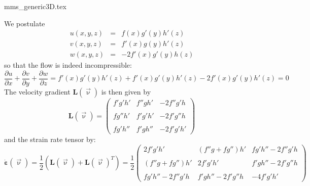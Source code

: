 \begin{flushright} {\tiny {\color{gray} mms\_generic3D.tex}} \end{flushright}

We postulate
\begin{eqnarray}
u(x,y,z) &=& f(x) g'(y) h'(z) \\
v(x,y,z) &=& f'(x) g(y) h'(z) \\
w(x,y,z) &=& -2f'(x) g'(y) h(z) 
\end{eqnarray}
so that the flow is indeed incompressible: 
\[
\frac{\partial u}{\partial x}+
\frac{\partial v}{\partial y}+
\frac{\partial w}{\partial z}
=
f'(x) g'(y) h'(z) + f'(x) g'(y) h'(z) -2f'(x) g'(y) h'(z)
=0
\]
The velocity gradient ${\bm L}(\vec\upnu)$ is then given by
\[
{\bm L}(\vec\upnu) =
\left(
\begin{array}{ccc}
f'g'h' &  f'' g h' & -2f'' g' h \\ \\
fg''h' & f'g'h'    & -2f' g'' h \\ \\
fg'h'' & f'gh''    & -2f'g'h'
\end{array}
\right)
\]
and the strain rate tensor by:
\[
\dot{\bm \varepsilon}(\vec\upnu)
=\frac{1}{2}({\bm L}(\vec\upnu)+{\bm L}(\vec\upnu)^T)
=
\frac{1}{2}
\left(
\begin{array}{ccc}
2f'g'h' & (f'' g+fg'') h'  & fg'h''-2f'' g' h \\ \\
(f''g+fg'')h' & 2f'g'h'    & f'gh''-2f' g'' h \\ \\
fg'h'' -2f'' g' h & f'gh'' -2f' g'' h    & -4f'g'h'
\end{array}
\right)
\]

